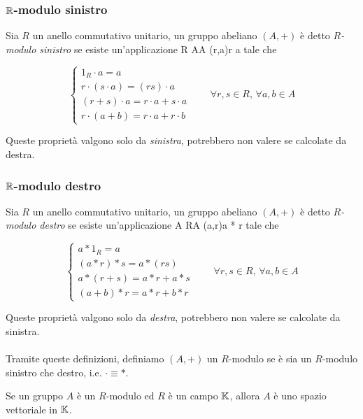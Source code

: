 \subsubsection{$ \mathbb{R} $-modulo sinistro}

Sia $ R $ un anello commutativo unitario, un gruppo abeliano $ (A,+) $ è detto $ R $\textit{-modulo sinistro} se esiste un'applicazione
%
\map{\cdot}
	{R \times A}{A}
	{(r,a)}{r \cdot a}
%
tale che

\begin{equation}
	\begin{cases}
		1_{R} \cdot a = a \\
		r \cdot (s \cdot a) = (r s) \cdot a \\
		(r+s) \cdot a = r \cdot a + s \cdot a \\
		r \cdot (a+b) = r \cdot a + r \cdot b
	\end{cases} %
	\qquad \forall r, s \in R, \, \forall a, b \in A
\end{equation}

Queste proprietà valgono solo da \textit{sinistra}, potrebbero non valere se calcolate da destra.

\subsubsection{$ \mathbb{R} $-modulo destro}

Sia $ R $ un anello commutativo unitario, un gruppo abeliano $ (A,+) $ è detto $ R $\textit{-modulo destro} se esiste un'applicazione
%
\map{*}
	{A \times R}{A}
	{(a,r)}{a * r}
%	
tale che

\begin{equation}
	\begin{cases}
		a * 1_{R} = a \\
		(a*r)*s = a*(r s) \\
		a*(r+s) = a*r + a*s \\
		(a+b)*r = a*r + b*r
	\end{cases} %
	\qquad \forall r, s \in R, \, \forall a, b \in A
\end{equation}

Queste proprietà valgono solo da \textit{destra}, potrebbero non valere se calcolate da sinistra. \\ \\
%
Tramite queste definizioni, definiamo $ (A,+) $ un $ R $-modulo se è sia un $ R $-modulo sinistro che destro, i.e. $ \cdot \equiv * $.

\begin{remark}
	Se un gruppo $ A $ è un $ R $-modulo ed $ R $ è un campo $ \mathbb{K} $, allora $ A $ è uno spazio vettoriale in $ \mathbb{K} $.
\end{remark}

